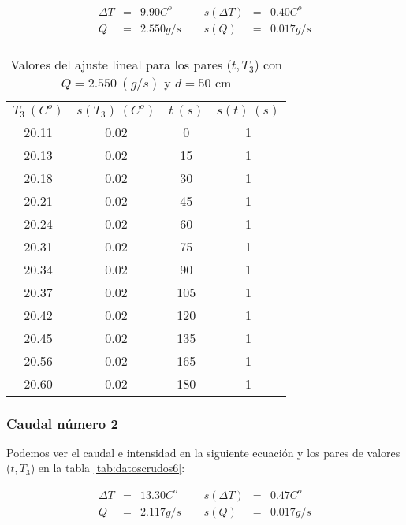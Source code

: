 \documentclass[12pt,a4paper]{article}
\begin{document}
\begin{equation} 
\begin{array}{lllllll}
\Delta T & = & 9.90 C^o &  \ \ &  s(\Delta T) & =  & 0.40  C^o \\ 
 Q & = & 2.550 g/s &  \ \ &  s(Q) & =  & 0.017  g/s \\ 
 \end{array} 
\end{equation} 
 
 \begin{table}[h!] 	 \centering 
\begin{tabular}{|c|c|c|c|} 
\hline 
$T_3 \ (C^o)$ & $s(T_3) \ (C^o)$ & $ t \ (s)$ & $s(t) \ (s)$  \\ \hline 
20.11  & 0.02 &  0 & 1 \\ 
\hline
20.13  & 0.02 &  15 & 1 \\ 
\hline
20.18  & 0.02 &  30 & 1 \\ 
\hline
20.21  & 0.02 &  45 & 1 \\ 
\hline
20.24  & 0.02 &  60 & 1 \\ 
\hline
20.31  & 0.02 &  75 & 1 \\ 
\hline
20.34  & 0.02 &  90 & 1 \\ 
\hline
20.37  & 0.02 &  105 & 1 \\ 
\hline
20.42  & 0.02 &  120 & 1 \\ 
\hline
20.45  & 0.02 &  135 & 1 \\ 
\hline
20.56  & 0.02 &  165 & 1 \\ 
\hline
20.60  & 0.02 &  180 & 1 \\ 
\hline
\end{tabular} 
\caption{Valores del ajuste lineal para los pares ($t,T_3$) con $Q=2.550 \ (g/s)$ y $d= 50 $ cm} 
\label{tab:datoscrudos5} 
\end{table} 
 
 \newpage
 
\subsubsection{Caudal número 2} \label{subsec:7} 
 
Podemos ver el caudal e intensidad en la siguiente ecuación y los pares de valores ($t,T_3$) en la tabla \ref{tab:datoscrudos6}: 
 
\begin{equation} 
\begin{array}{lllllll}
\Delta T & = & 13.30 C^o &  \ \ &  s(\Delta T) & =  & 0.47  C^o \\ 
 Q & = & 2.117 g/s &  \ \ &  s(Q) & =  & 0.017  g/s \\ 
 \end{array} 
\end{equation} 
 
\end{document}
